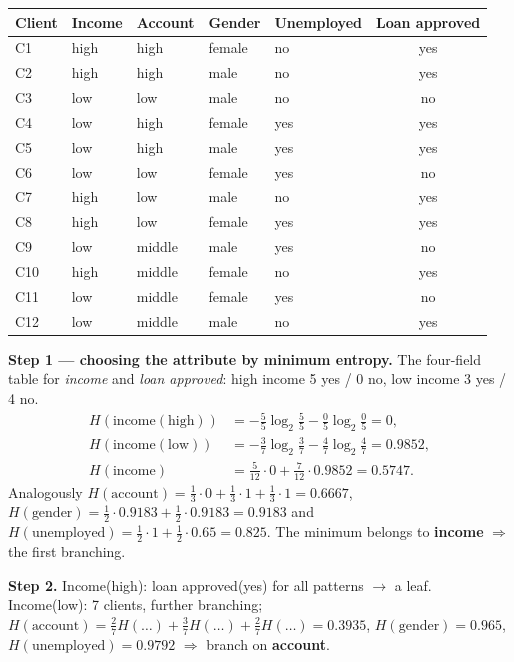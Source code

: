 \documentclass[11pt,a4paper]{article}
\theoremstyle{definition}
\begin{document}
\begin{defbox}
\begin{center}
\small
\begin{tabular}{@{}lllllc@{}}
\toprule
Client & Income & Account & Gender & Unemployed & Loan approved \\
\midrule
C1 & high & high & female & no & yes \\
C2 & high & high & male & no & yes \\
C3 & low & low & male & no & no \\
C4 & low & high & female & yes & yes \\
C5 & low & high & male & yes & yes \\
C6 & low & low & female & yes & no \\
C7 & high & low & male & no & yes \\
C8 & high & low & female & yes & yes \\
C9 & low & middle & male & yes & no \\
C10 & high & middle & female & no & yes \\
C11 & low & middle & female & yes & no \\
C12 & low & middle & male & no & yes \\
\bottomrule
\end{tabular}
\end{center}

\textbf{Step 1 --- choosing the attribute by minimum entropy.} The four-field table for
\emph{income} and \emph{loan approved}: high income 5 yes / 0 no, low income 3 yes / 4 no.
\begin{align*}
H(\text{income}(\text{high}))&=-\tfrac55\log_2\tfrac55-\tfrac05\log_2\tfrac05=0,\\
H(\text{income}(\text{low}))&=-\tfrac37\log_2\tfrac37-\tfrac47\log_2\tfrac47=0.9852,\\
H(\text{income})&=\tfrac{5}{12}\cdot 0+\tfrac{7}{12}\cdot 0.9852=0.5747.
\end{align*}
Analogously $H(\text{account})=\tfrac13\cdot 0+\tfrac13\cdot 1+\tfrac13\cdot 1=0.6667$,
$H(\text{gender})=\tfrac12\cdot 0.9183+\tfrac12\cdot 0.9183=0.9183$ and
$H(\text{unemployed})=\tfrac12\cdot 1+\tfrac12\cdot 0.65=0.825$.
The minimum belongs to \textbf{income} $\Rightarrow$ the first branching.

\textbf{Step 2.} Income(high): loan approved(yes) for all patterns $\to$ a leaf. Income(low):
7 clients, further branching; $H(\text{account})=\tfrac27 H(\dots)+\tfrac37 H(\dots)+\tfrac27
H(\dots)=0.3935$, $H(\text{gender})=0.965$, $H(\text{unemployed})=0.9792$ $\Rightarrow$ branch on
\textbf{account}.


\end{defbox}
\end{document}
